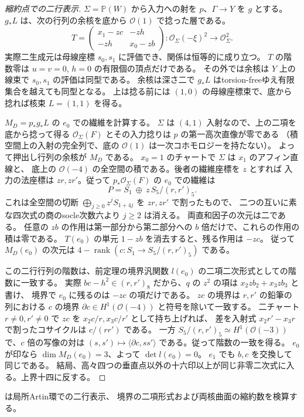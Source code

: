 \begin{proof}[縮約点での二行表示]
$\Sigma=\mathbb P(W)$ から入力への射を $p$、$\Gamma\to Y$ を $g$ とする。
$g_*L$ は、次の行列の余核を底から $\mathcal O(1)$ で捻った層である。
\[
  T=\begin{pmatrix}x_1-zc&-zh\\-zh&x_0-zb\end{pmatrix}:
       \mathcal O_\Sigma(-\xi)^2\longrightarrow\mathcal O_\Sigma^2 .
\]
実際二生成元は母線座標 $s_0,s_1$ に評価でき、関係は恒等的に成り立つ。
$T$ の階数零は $u=v=0$, $h=0$ の有限個の頂点だけである。
その外では余核は $Y$ 上の線束で $s_0,s_1$ の評価は同型である。
余核は深さ二で $g_*L$ はtorsion-freeゆえ有限集合を越えても同型となる。
上は捻る前には $(1,0)$ の母線座標束で、底から捻れば核束 $L=(1,1)$ を得る。

$M_D=p_*g_*L$ の $e_0$ での繊維を計算する。
$\Sigma$ は $(4,1)$ 入射なので、上の二項を底から捻って得る
$\mathcal O_\Sigma(F)$ とその入力捻りは $p$ の第一高次直像が零である
（積空間上の入射の完全列で、底の $\mathcal O(1)$ は一次コホモロジーを持たない）。
よって押出し行列の余核が $M_D$ である。
$x_0=1$ のチャートで $\Sigma$ は $x_1$ のアフィン直線と、
底上の $\mathcal O(-4)$ の全空間の積である。後者の繊維座標を $z$ とすれば
入力の法座標は $z r,z r'$。従って $p_*\mathcal O_\Sigma(F)$ の $e_0$ での繊維は
\[
      P=S_1\ \oplus\ z\,S_5/(r,r')_5 .
\]
これは全空間の切断 $\bigoplus_{j\ge0} z^j S_{1+4j}$ を $z r,z r'$ で割ったもので、
二つの互いに素な四次式の商のsocle次数六より $j\ge2$ は消える。
両直和因子の次元は二である。
任意の $z b$ の作用は第一部分から第二部分への $b$ 倍だけで、これらの作用の積は零である。
$T(e_0)$ の単元 $1-zb$ を消去すると、残る作用は $-zc$。
従って $M_D(e_0)$ の次元は $4-\operatorname{rank}(c:S_1\to S_5/(r,r')_5)$ である。

この二行行列の階数は、前定理の境界汎関数 $l(e_0)$ の二項二次形式としての階数に一致する。
実際 $bc-h^2\in(r,r')_8$ だから、$q$ の $z^2$ の項は $x_2 z b_2+x_3 z b_3$ と書け、
境界で $e_0$ に残るのは $-zc$ の項だけである。
$z c$ の境界は $r,r'$ の鉛筆の列における $c$ の境界
$\partial c\in H^1(\mathcal O(-4))$ と符号を除いて一致する。
二チャート $r\ne0,r'\ne0$ で $z c$ を $x_2 c/r,x_3 c/r'$ として持ち上げれば、
差を入射式 $x_2r'-x_3r$ で割ったコサイクルは $c/(rr')$ である。
一方 $S_5/(r,r')_5\simeq H^1(\mathcal O(-3))$ で、$c$ 倍の写像の対は
$(s,s')\mapsto\langle\partial c,ss'\rangle$ である。従って階数の一致を得る。
$e_0$ が印なら $\dim M_D(e_0)=3$、よって $\det l(e_0)=0$。
$e_1$ でも $b,c$ を交換して同じである。
結局、高々四つの垂直点以外の十六印以上が同じ非零二次式に入る。上界十四に反する。
\end{proof}
 は局所Artin環での二行表示、
境界の二項形式および両核曲面の縮約数を検算する。
